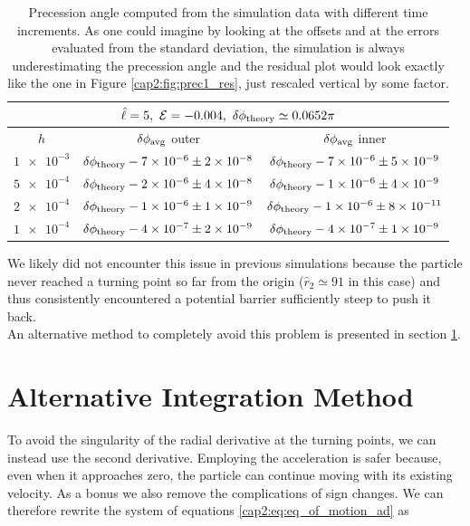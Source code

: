 \begin{table}[h]
    \centering
    \begin{tabular}{|c|c|c|}
        \hline
        \multicolumn{3}{|c|}{$\hat \ell = 5, ~ \mathcal E = -0.004,
        ~ \delta \phi_{\rm theory} \simeq 0.0652 \pi$} \\
        \hline
        $h$ & $\delta \phi_{\rm avg}$ outer & $\delta \phi_{\rm avg}$ inner \\
        \hline
        $\num{1e-3}$ & $\delta \phi_{\rm theory} - \num{7e-6} \pm \num{2e-8}$
        & $\delta \phi_{\rm theory} - \num{7e-6} \pm \num{5e-9}$ \\
        \hline
        $\num{5e-4}$ & $\delta \phi_{\rm theory} - \num{2e-6} \pm \num{4e-8}$
        & $\delta \phi_{\rm theory} - \num{1e-6} \pm \num{4e-9}$ \\
        \hline
        $\num{2e-4}$ & $\delta \phi_{\rm theory} - \num{1e-6} \pm \num{1e-9}$
        & $\delta \phi_{\rm theory} - \num{1e-6} \pm \num{8e-11}$ \\
        \hline
        $\num{1e-4}$ & $\delta \phi_{\rm theory} - \num{4e-7} \pm \num{2e-9}$
        & $\delta \phi_{\rm theory} - \num{4e-7} \pm \num{1e-9}$ \\
        \hline
    \end{tabular}
    \caption{Precession angle computed from the simulation data with different
    time increments.
    As one could imagine by looking at the offsets and at the errors evaluated
    from the standard deviation, the simulation is always underestimating the
    precession angle and the residual plot would look exactly like the one in
    Figure \ref{cap2:fig:prec1_res}, just rescaled vertical by some factor.}
    \label{cap2:tab:prec1}
\end{table}

We likely did not encounter this issue in previous simulations because the
particle never reached a turning point so far from the origin
($\hat r_2 \simeq 91$ in this case) and thus consistently encountered a
potential barrier sufficiently steep to push it back. \\
An alternative method to completely avoid this problem is presented in section
\ref{cap2:sec:alt_method}.


\section{Alternative Integration Method}
\label{cap2:sec:alt_method}

To avoid the singularity of the radial derivative at the turning points, we can
instead use the second derivative. Employing the acceleration is safer because,
even when it approaches zero, the particle can continue moving with its existing
velocity.
As a bonus we also remove the complications of sign changes.
We can therefore rewrite the system of equations \ref{cap2:eq:eq_of_motion_ad}
as


